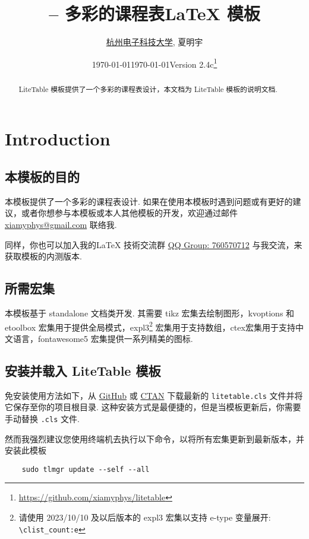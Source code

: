 \documentclass[11pt]{article}
\title{\bfseries\pkg{LiteTable} -- 多彩的课程表\textsf{\LaTeX} 模板}
\author{\href{https://www.hdu.edu.cn}{杭州电子科技大学}, 夏明宇}
\date{\today}
\affil{\href{mailto:xiamyphys@gmail.com}{\texttt{xiamyphys@gmail.com}}}
\date{\today\quad Version 2.4c\thanks{%
  \url{https://github.com/xiamyphys/litetable}}}
\def\pkg#1{\texorpdfstring{\textcolor{pkgcolor}{\textsf{#1}}}{“#1”}}
\begin{document}
\maketitle

\vspace{-2em}
\begin{abstract}
\pkg{LiteTable} 模板提供了一个多彩的课程表设计，本文档为 \pkg{LiteTable} 模板的说明文档.
\end{abstract}

\tableofcontents

\clearpage

\section{Introduction}

\subsection{本模板的目的}
本模板提供了一个多彩的课程表设计. 如果在使用本模板时遇到问题或有更好的建议，或者你想参与本模板或本人其他模板的开发，欢迎通过邮件 \href{mailto:xiamyphys@gmail.com}{xiamyphys@gmail.com} 联络我.

同样，你也可以加入我的\textsf\LaTeX{} 技術交流群 \href{https://qm.qq.com/q/OnHzbNvVAG}{QQ Group: 760570712} 与我交流，来获取模板的内测版本.

\subsection{所需宏集}
本模板基于 \pkg{standalone} 文档类开发. 其需要 \pkg{tikz} 宏集去绘制图形，\pkg{kvoptions} 和 \pkg{etoolbox} 宏集用于提供全局模式，\pkg{expl3}\footnote{请使用 2023/10/10 及以后版本的 \pkg{expl3} 宏集以支持 e-type 变量展开: \verb|\clist_count:e|} 宏集用于支持数组，\pkg{ctex}宏集用于支持中文语言，\pkg{fontawesome5} 宏集提供一系列精美的图标.

\subsection{安装并载入 \pkg{LiteTable} 模板}
免安装使用方法如下，从 \href{https://github.com/xiamyphys/LiteTable}{GitHub} 或 \href{https://ctan.org/pkg/litetable}{CTAN} 下载最新的 \verb|litetable.cls| 文件并将它保存至你的项目根目录. 这种安装方式是最便捷的，但是当模板更新后，你需要手动替换 \verb|.cls| 文件.

然而我强烈建议您使用终端机去执行以下命令，以将所有宏集更新到最新版本，并安装此模板
\begin{verbatim}
    sudo tlmgr update --self --all
\end{verbatim}
\end{document}
